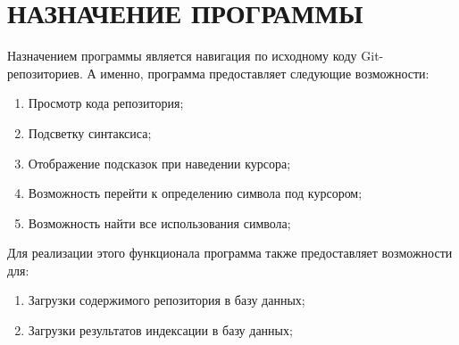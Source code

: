 \section{\uppercase{Назначение программы}}

Назначением программы является навигация по исходному коду Git-репозиториев. А именно, программа предоставляет следующие возможности:
\begin{enumerate}
    \item Просмотр кода репозитория;
    \item Подсветку синтаксиса;
    \item Отображение подсказок при наведении курсора;
    \item Возможность перейти к определению символа под курсором;
    \item Возможность найти все использования символа;
\end{enumerate}

Для реализации этого функционала программа также предоставляет возможности для:
\begin{enumerate}
    \item Загрузки содержимого репозитория в базу данных;
    \item Загрузки результатов индексации в базу данных;
\end{enumerate}

\clearpage
